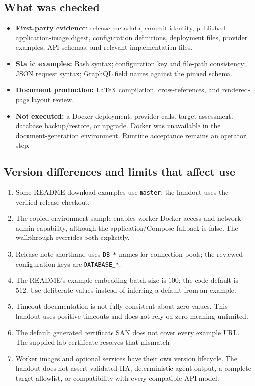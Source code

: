 \documentclass[11pt,letterpaper]{article}
\newcommand{\code}[1]{\nolinkurl{#1}}
\begin{document}
\subsection{What was checked}
\begin{itemize}
\item \textbf{First-party evidence:} release metadata, commit identity, published
application-image digest, configuration definitions, deployment files,
provider examples, API schemas, and relevant implementation files.
\item \textbf{Static examples:} Bash syntax; configuration key and file-path
consistency; JSON request syntax; GraphQL field names against the pinned schema.
\item \textbf{Document production:} LaTeX compilation, cross-references, and
rendered-page layout review.
\item \textbf{Not executed:} a Docker deployment, provider calls, target
assessment, database backup/restore, or upgrade. Docker was unavailable in the
document-generation environment. Runtime acceptance remains an operator step.
\end{itemize}

\subsection{Version differences and limits that affect use}
\begin{enumerate}
\item Some README download examples use \code{master}; the handout uses the
verified release checkout.
\item The copied environment sample enables worker Docker access and
network-admin capability, although the application/Compose fallback is false.
The walkthrough overrides both explicitly.
\item Release-note shorthand uses \code{DB_*} names for connection pools;
the reviewed configuration keys are \code{DATABASE_*}.
\item The README's example embedding batch size is 100; the code default is 512.
Use deliberate values instead of inferring a default from an example.
\item Timeout documentation is not fully consistent about zero values.
This handout uses positive timeouts and does not rely on zero meaning unlimited.
\item The default generated certificate SAN does not cover every example URL.
The supplied lab certificate resolves that mismatch.
\item Worker images and optional services have their own version lifecycle.
The handout does not assert validated HA, deterministic agent output, a complete
target allowlist, or compatibility with every compatible-API model.
\end{enumerate}
\end{document}
